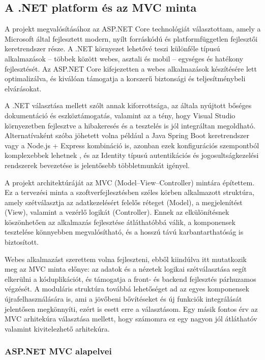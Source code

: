\subsection{A .NET platform és az MVC minta}

\indent A projekt megvalósításához az ASP.NET Core technológiát választottam, amely a Microsoft által fejlesztett modern, nyílt forráskódú és platformfüggetlen fejlesztői keretrendszer része. A .NET környezet lehetővé teszi különféle típusú alkalmazások – többek között webes, asztali és mobil – egységes és hatékony fejlesztését. Az ASP.NET Core kifejezetten a webes alkalmazások készítésére lett optimalizálva, és kiválóan támogatja a korszerű biztonsági és teljesítménybeli elvárásokat. 

A .NET választása mellett szólt annak kiforrottsága, az általa nyújtott bőséges dokumentáció és eszköztámogatás, valamint az a tény, hogy Visual Studio környezetben fejlesztve a hibakeresés és a tesztelés is jól integráltan megoldható. Alternatívaként szóba jöhetett volna például a Java Spring Boot keretrendszer vagy a Node.js + Express kombináció is, azonban ezek konfigurációs szempontból komplexebbek lehetnek , és az Identity típusú autentikációs és jogosultságkezelési rendszerek bevezetése is jelentősebb többletmunkát igényel.

A projekt architektúráját az MVC (Model–View–Controller) mintára építettem. Ez a tervezési minta a szoftverfejlesztésben széles körben alkalmazott struktúra, amely szétválasztja az adatkezelésért felelős réteget (Model), a megjelenítést (View), valamint a vezérlő logikát (Controller). Ennek az elkülönítésnek köszönhetően az alkalmazás fejlesztése átláthatóbbá válik, a komponensek tesztelése könnyebben megvalósítható, és a hosszú távú karbantarthatóság is biztosított.

Webes alkalmazást szerettem volna fejleszteni, ebből kiindúlva itt mutatkozik meg az MVC minta előnye: az adatok és a nézetek logikai szétválasztása segít elkerülni a kóduplikációt, és támogatja a front- és backend fejlesztés párhuzamos végzését. A moduláris struktúra továbbá lehetőséget ad az egyes komponensek újrafelhasználására is, ami a jövőbeni bővítéseket és új funkciók integrálását jelentősen megkönnyíti, ezért is esett erre a választásom. Egy másik fontos érv az MVC arhitekúra választása mellett, hogy számomra ez egy nagyon jól átláthatóv valamint kivitelezhető arhitekúra.

\subsubsection{ASP.NET MVC alapelvei}

